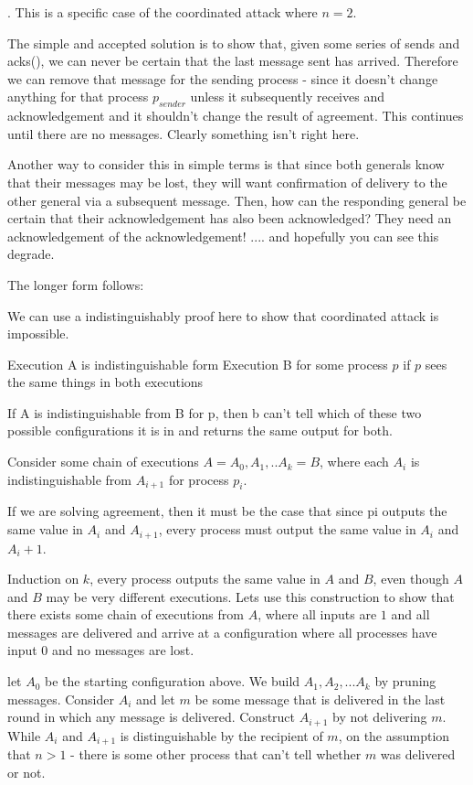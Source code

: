 \documentclass[12pt]{article}
\newcounter{question}
\newcommand{\question}[1]{
    \stepcounter{question}
    \thequestion. #1 \hfill
}
\begin{document}
\question{
    This is a specific case of the coordinated attack where $n = 2$.

    The simple and accepted solution is to show that, given some series of sends and acks(), we can never
    be certain that the last message sent has arrived. Therefore we can remove that message for the sending
    process - since it doesn't change anything for that process $p_{sender}$ unless it subsequently receives and acknowledgement and it shouldn't change the result of agreement. This continues until there are no messages. Clearly
    something isn't right here.

    Another way to consider this in simple terms is that since both generals know that their messages may be lost,
    they will want confirmation of delivery to the other general via a subsequent message. Then, how can the responding general be certain that their acknowledgement has also been acknowledged? They need an acknowledgement of the acknowledgement! .... and hopefully you can see this degrade.

    The longer form follows:

    We can use a indistinguishably proof here to show that coordinated attack is impossible.

    Execution A is indistinguishable form Execution B for some process $p$ if $p$ sees the same things
    in both executions

    If A is indistinguishable from B for p, then b can't tell which of these two possible configurations
    it is in and returns the same output for both.

    Consider some chain of executions $A = A_0,A_1,..A_k = B$, where each $A_i$ is indistinguishable from $A_{i+1}$ for process $p_i$.

    If we are solving agreement, then it must be the case that since pi outputs the same value in $A_i$ and $A_{i+1}$, every
    process must output the same value in $A_i$ and $A_i+1$.

    Induction on $k$, every process outputs the same value in $A$ and $B$, even though $A$ and $B$ may be very different executions.
    Lets use this construction to show that there exists some chain of executions from $A$, where all inputs are $1$ and all messages
    are delivered and arrive at a configuration where all processes have input 0 and no messages are lost.

    let $A_0$ be the starting configuration above. We build $A_1, A_2,... A_k$ by pruning messages. Consider $A_i$ and let $m$ be some message
    that is delivered in the last round in which any message is delivered. Construct $A_{i+1}$ by not delivering $m$. While $A_i$ and $A_{i+1}$
    is distinguishable by the recipient of $m$, on the assumption that $n > 1$ - there is some other process that can't tell whether
    $m$ was delivered or not.

}
\end{document}
